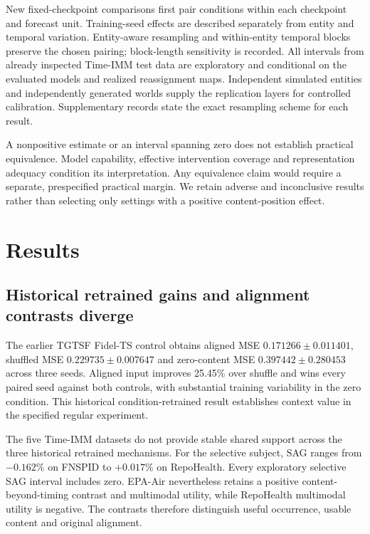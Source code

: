 \documentclass[preprint,11pt]{elsarticle}
\begin{document}
New fixed-checkpoint comparisons first pair conditions within each checkpoint and forecast unit. Training-seed effects are described separately from entity and temporal variation. Entity-aware resampling and within-entity temporal blocks preserve the chosen pairing; block-length sensitivity is recorded. All intervals from already inspected Time-IMM test data are exploratory and conditional on the evaluated models and realized reassignment maps. Independent simulated entities and independently generated worlds supply the replication layers for controlled calibration. Supplementary records state the exact resampling scheme for each result.

A nonpositive estimate or an interval spanning zero does not establish practical equivalence. Model capability, effective intervention coverage and representation adequacy condition its interpretation. Any equivalence claim would require a separate, prespecified practical margin. We retain adverse and inconclusive results rather than selecting only settings with a positive content-position effect.

\section{Results}
\label{sec:results}



\subsection{Historical retrained gains and alignment contrasts diverge}
\label{sec:historical_results}

The earlier TGTSF Fidel-TS control obtains aligned MSE $0.171266\pm0.011401$, shuffled MSE $0.229735\pm0.007647$ and zero-content MSE $0.397442\pm0.280453$ across three seeds. Aligned input improves 25.45\% over shuffle and wins every paired seed against both controls, with substantial training variability in the zero condition. This historical condition-retrained result establishes context value in the specified regular experiment.

The five Time-IMM datasets do not provide stable shared support across the three historical retrained mechanisms. For the selective subject, SAG ranges from $-0.162\%$ on FNSPID to $+0.017\%$ on RepoHealth. Every exploratory selective SAG interval includes zero. EPA-Air nevertheless retains a positive content-beyond-timing contrast and multimodal utility, while RepoHealth multimodal utility is negative. The contrasts therefore distinguish useful occurrence, usable content and original alignment.
\end{document}
